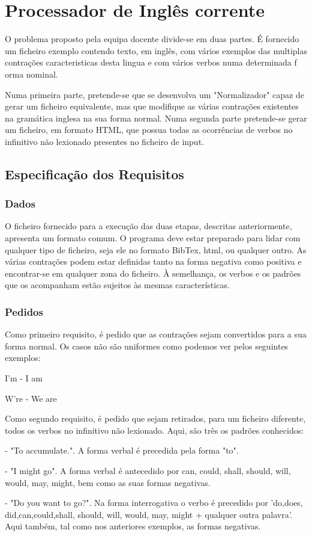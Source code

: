 \documentclass{report}
\begin{document}
\section{Processador de Inglês corrente}
O problema proposto pela equipa docente divide-se em duas partes. É fornecido um 
ficheiro exemplo contendo texto, em inglês, com vários exemplos das multiplas 
contrações caracteristicas desta lingua e com vários verbos numa determinada f
orma nominal. 

Numa primeira parte, pretende-se que se desenvolva um "Normalizador" capaz 
de gerar um ficheiro equivalente, mas que modifique as várias contrações 
existentes na gramática inglesa na sua forma normal. Numa segunda parte 
pretende-se gerar um ficheiro, em formato HTML, que possua todas as 
ocorrências de verbos no infinitivo não lexionado presentes no ficheiro 
de input. 

\subsection{Especificação dos Requisitos}
\subsubsection{Dados}
O ficheiro fornecido para a execução das duas etapas, descritas anteriormente, 
apresenta um formato comum. O programa deve estar preparado para lidar com 
qualquer tipo de ficheiro, seja ele no formato BibTex, html, ou qualquer outro. 
As várias contrações podem estar definidas tanto na forma negativa como positiva e 
encontrar-se em qualquer zona do ficheiro. À semelhança, os verbos e os padrões 
que os acompanham estão sujeitos às mesmas características.

\subsubsection{Pedidos}
Como primeiro requisito, é pedido que as contrações sejam convertidos para a 
sua forma normal. Os casos não são uniformes como podemos ver pelos seguintes exemplos:\par
I'm - I am\par
W're - We are\par
Como segundo requisito, é pedido que sejam retirados, para um ficheiro diferente, 
todos os verbos no infinitivo não lexionado. Aqui, são três os padrões conhecidos:\par
- "To accumulate.". A forma verbal é precedida pela forma "to".\par
- "I might go". A forma verbal é antecedido por can, could, shall, should, will, 
would, may, might, 
bem como as suas formas negativas.\par
- "Do you want to go?". Na forma interrogativa o verbo é precedido por 'do,does,
did,can,could,shall, should, will, would, may, might + qualquer outra palavra'. 
Aqui também, tal como nos anteriores exemplos, as formas negativas.
\end{document}
